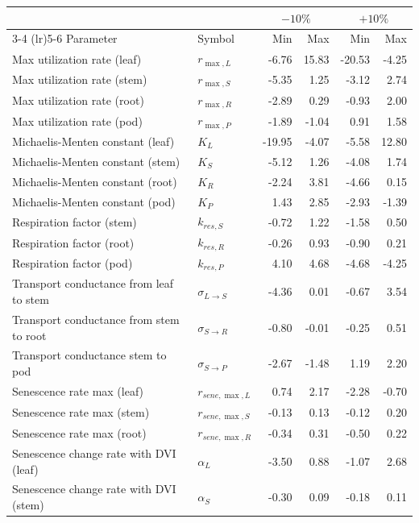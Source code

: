 \begin{tabular}{llrrrr}
  \toprule
  & & \multicolumn{2}{c}{$-10\%$} & \multicolumn{2}{c}{$+10\%$} \\
  \cmidrule(lr){3-4} \cmidrule(lr){5-6}
  Parameter & Symbol & Min & Max & Min & Max \\
  \midrule
  Max utilization rate (leaf) & $r_{\max,L}$ & -6.76 & 15.83 & -20.53 & -4.25 \\
  Max utilization rate (stem) & $r_{\max,S}$ & -5.35 & 1.25 & -3.12 & 2.74 \\
  Max utilization rate (root) & $r_{\max,R}$ & -2.89 & 0.29 & -0.93 & 2.00 \\
  Max utilization rate (pod) & $r_{\max,P}$ & -1.89 & -1.04 & 0.91 & 1.58 \\
  Michaelis-Menten constant (leaf) & $K_{L}$ & -19.95 & -4.07 & -5.58 & 12.80 \\
  Michaelis-Menten constant (stem) & $K_{S}$ & -5.12 & 1.26 & -4.08 & 1.74 \\
  Michaelis-Menten constant (root) & $K_{R}$ & -2.24 & 3.81 & -4.66 & 0.15 \\
  Michaelis-Menten constant (pod) & $K_{P}$ & 1.43 & 2.85 & -2.93 & -1.39 \\
  Respiration factor (stem) & $k_{res,S}$ & -0.72 & 1.22 & -1.58 & 0.50 \\
  Respiration factor (root) & $k_{res,R}$ & -0.26 & 0.93 & -0.90 & 0.21 \\
  Respiration factor (pod) & $k_{res,P}$ & 4.10 & 4.68 & -4.68 & -4.25 \\
  Transport conductance from leaf to stem & $\sigma_{L \to S}$ & -4.36 & 0.01 & -0.67 & 3.54 \\
  Transport conductance from stem to root & $\sigma_{S \to R}$ & -0.80 & -0.01 & -0.25 & 0.51 \\
  Transport conductance stem to pod & $\sigma_{S \to P}$ & -2.67 & -1.48 & 1.19 & 2.20 \\
  Senescence rate max (leaf) & $r_{sene,\max,L}$ & 0.74 & 2.17 & -2.28 & -0.70 \\
  Senescence rate max (stem) & $r_{sene,\max,S}$ & -0.13 & 0.13 & -0.12 & 0.20 \\
  Senescence rate max (root) & $r_{sene,\max,R}$ & -0.34 & 0.31 & -0.50 & 0.22 \\
  Senescence change rate with DVI (leaf) & $\alpha_{L}$ & -3.50 & 0.88 & -1.07 & 2.68 \\
  Senescence change rate with DVI (stem) & $\alpha_{S}$ & -0.30 & 0.09 & -0.18 & 0.11 \\

\end{tabular}
